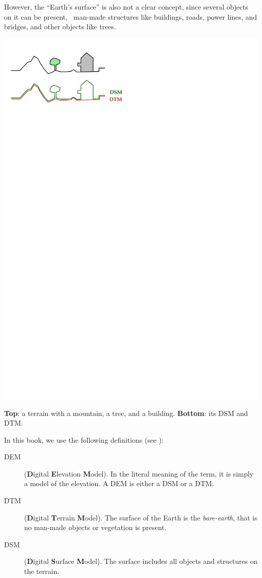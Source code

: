 However, the ``Earth's surface'' is also not a clear concept, since several objects on it can be present, \eg\ man-made structures like buildings, roads, power lines, and bridges, and other objects like trees.

\begin{marginfigure}
  \includegraphics{figs/dtmdsm}
  \caption{\textbf{Top}: a terrain with a mountain, a tree, and a building. \textbf{Bottom}: its DSM and DTM.}%
\end{marginfigure}
In this book, we use the following definitions (see ):
\begin{description}
  \item[DEM] (\textbf{D}igital \textbf{E}levation \textbf{M}odel). In the literal meaning of the term, it is simply a model of the elevation. A DEM is either a DSM or a DTM\@. 
  \item[DTM] (\textbf{D}igital \textbf{T}errain \textbf{M}odel). The surface of the Earth is the \emph{bare-earth}, that is no man-made objects or vegetation is present. 
  \item[DSM] (\textbf{D}igital \textbf{S}urface \textbf{M}odel). The surface includes all objects and structures on the terrain.
\end{description}

